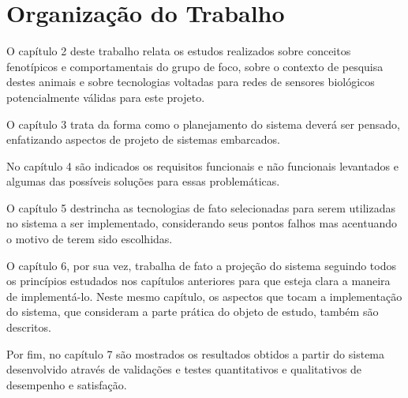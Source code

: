 \section{Organização do Trabalho}
O capítulo 2 deste trabalho relata os estudos realizados sobre conceitos fenotípicos e comportamentais do grupo de foco, sobre o contexto de pesquisa destes animais e sobre tecnologias voltadas para redes de sensores biológicos potencialmente válidas para este projeto.

O capítulo 3 trata da forma como o planejamento do sistema deverá ser pensado, enfatizando aspectos de projeto de sistemas embarcados.

No capítulo 4 são indicados os requisitos funcionais e não funcionais levantados e algumas das possíveis soluções para essas problemáticas.

O capítulo 5 destrincha as tecnologias de fato selecionadas para serem utilizadas no sistema a ser implementado, considerando seus pontos falhos mas acentuando o motivo de terem sido escolhidas.

O capítulo 6, por sua vez, trabalha de fato a projeção do sistema seguindo todos os princípios estudados nos capítulos anteriores para que esteja clara a maneira de implementá-lo. Neste mesmo capítulo, os aspectos que tocam a implementação do sistema, que consideram a parte prática do objeto de estudo, também são descritos.

Por fim, no capítulo 7 são mostrados os resultados obtidos a partir do sistema desenvolvido através de validações e testes quantitativos e qualitativos de desempenho e satisfação.
